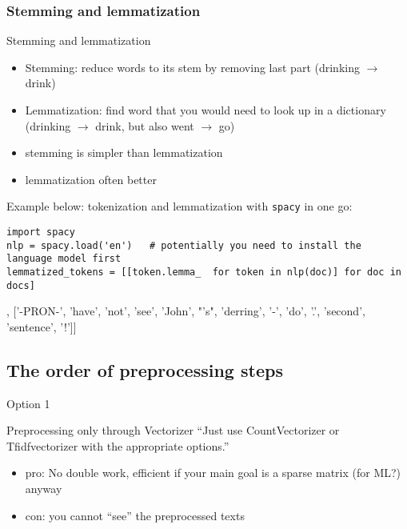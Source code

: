 


\subsubsection{Stemming and lemmatization}


\begin{frame}[fragile]{Stemming and lemmatization}
\begin{itemize}
\item Stemming: reduce words to its stem by removing last part (drinking $\rightarrow$ drink)
\item Lemmatization: find word that you would need to look up in a dictionary (drinking $\rightarrow$ drink, but also went $\rightarrow$ go)
\item stemming is simpler than lemmatization
\item lemmatization often better
\end{itemize}
\pause

Example below: tokenization and lemmatization with \texttt{spacy} in one go:
\begin{lstlisting}
import spacy
nlp = spacy.load('en')   # potentially you need to install the language model first
lemmatized_tokens = [[token.lemma_  for token in nlp(doc)] for doc in docs]
\end{lstlisting}
\begin{lstlistingoutputtiny}
[['this', 'be', 'a', 'text'], ['-PRON-', 'have', 'not', 'see', 'John', "'s", 'derring', '-', 'do', '.', 'second', 'sentence', '!']]
\end{lstlistingoutputtiny}
\end{frame}



\subsection{The order of preprocessing steps}

\begin{frame}{Option 1}
\begin{block}{Preprocessing only through Vectorizer}
``Just use CountVectorizer or Tfidfvectorizer with the appropriate options.''	
\begin{itemize}
	\item pro: No double work, efficient if your main goal is a sparse matrix (for ML?) anyway
	\item con: you cannot ``see'' the preprocessed texts
\end{itemize}
\end{block}
\end{frame}

